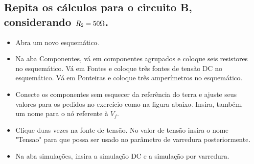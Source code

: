 
\subsection{Repita os cálculos para o circuito B, considerando $R_2 = 50 \ohm$.}

\begin{itemize}
    \item Abra um novo esquemático.
\end{itemize}

\begin{itemize}
    \item Na aba Componentes, vá em componentes
    agrupados e coloque seis resistores no esquemático.
    Vá em Fontes e coloque três fontes de tensão DC no
    esquemático. Vá em Ponteiras e coloque três
    amperímetros no esquemático.
\end{itemize}

\begin{figure}[H]
    \centering

\end{figure}

\begin{itemize}
    \item Conecte os componentes sem esquecer da
    referência do terra e ajuste seus valores para os
    pedidos no exercício como na figura abaixo. Insira, também, um nome para o nó referente à $V_f$.
\end{itemize}


\begin{itemize}
    \item Clique duas vezes na fonte de tensão. No valor de tensão insira o nome "Tensao" para que possa ser usado no parâmetro de varredura posteriormente.
\end{itemize}


\begin{itemize}
    \item Na aba simulações, insira a simulação DC e a simulação por varredura. 
\end{itemize}

